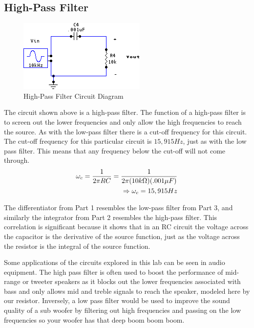 \documentclass[twocolumn,english]{IEEEtran}
\theoremstyle{plain}
\theoremstyle{plain}
\begin{document}
	\subsection{High-Pass Filter}
	\begin{figure}[H]
			\begin{centering}
			\begin{center}
			\includegraphics[width=.85\linewidth]{./Circuits/HighPassFilter.png}
			\caption{High-Pass Filter Circuit Diagram}
			\label{diag:highpass}
			\end{center}
			\par\end{centering}
	\end{figure}
	The circuit shown above is a high-pass filter.
	The function of a high-pass filter is to screen out the lower frequencies and only allow the high frequencies to reach the source.
	As with the low-pass filter there is a cut-off frequency for this circuit.
	The cut-off frequency for this particular circuit is $15,915 Hz$, just as with the low pass filter.
	This means that any frequency below the cut-off will not come through.
	\begin{align}
		\omega_c = \frac{1}{2\pi RC} = \frac{1}{2\pi (10 k\Omega)(.001 \mu F)} \\
		\Rightarrow \omega_c = 15,915 Hz \notag
	\end{align}

	The differentiator from Part 1 resembles the low-pass filter from Part 3, and similarly the integrator from Part 2 resembles the high-pass filter.
	This correlation is significant because it shows that in an RC circuit the voltage across the capacitor is the derivative of the source function, just as the voltage across the resistor is the integral of the source function.

	Some applications of the circuits explored in this lab can be seen in audio equipment. The high pass filter is often used to boost the performance of mid-range or tweeter speakers as it blocks out the lower frequencies associated with bass and only allows mid and treble signals to reach the speaker, modeled here by our resistor.
	Inversely, a low pass filter would be used to improve the sound quality of a sub woofer by filtering out high frequencies and passing on the low frequencies so your woofer has that deep boom boom boom.
\end{document}
